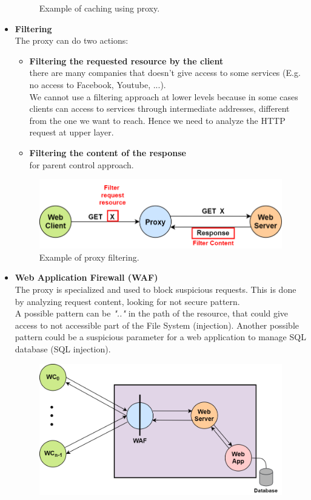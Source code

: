 \begin{itemize}
{\begin{figure}[h]
\caption{\footnotesize{Example of caching using proxy.}}\label{proxy_cache}
\end{figure}
}
\item{\textbf{Filtering}\\
The proxy can do two actions:
\begin{itemize}
\item{\textbf{Filtering the requested resource by the client}\\
there are many companies that doesn't give access to some services (E.g. no access to Facebook, Youtube, ...).\\
We cannot use a filtering approach at lower levels because in some cases clients can access to services through intermediate addresses, different from the one we want to reach. Hence we need to analyze the HTTP request at upper layer.}
\item{\textbf{Filtering the content of the response}\\
for parent control approach.}
\end{itemize}
\begin{figure}[h]
\centering
\includegraphics[scale=0.4]{Images/Gateway/proxy_filter}
\caption{\footnotesize{Example of proxy filtering.}}\label{proxy_filter}
\end{figure}
}
\item{\textbf{Web Application Firewall (WAF)}\\
The proxy is specialized and used to block suspicious requests. This is done by analyzing request content, looking for not secure pattern.\\
A possible pattern can be \textit{".."} in the path of the resource, that could give access to not accessible part of the File System (injection). Another possible pattern could be a suspicious parameter for a web application to manage SQL database (SQL injection).
\begin{figure}[h]
\centering
\includegraphics[scale=0.4]{Images/Gateway/proxy_waf}

\end{figure}}
\end{itemize}
